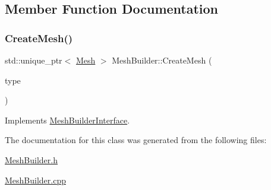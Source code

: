 \subsection{Member Function Documentation}
\mbox{\label{class_mesh_builder_a51d89fe601df06e63112c70416ac03dc}} 
\subsubsection{\texorpdfstring{CreateMesh()}{CreateMesh()}}
{\footnotesize\ttfamily std\+::unique\+\_\+ptr$<$ \mbox{\hyperlink{class_mesh}{Mesh}} $>$ Mesh\+Builder\+::\+Create\+Mesh (\begin{DoxyParamCaption}\item[{\mbox{\hyperlink{_mesh_builder_interface_8h_ad6436347ddb93aed826a19081b53dd61}{M\+E\+S\+H\+T\+Y\+PE}}}]{type }\end{DoxyParamCaption})\hspace{0.3cm}{\ttfamily [virtual]}}



Implements \mbox{\hyperlink{class_mesh_builder_interface_a2d9b31466ef198b2029438970af81323}{Mesh\+Builder\+Interface}}.



The documentation for this class was generated from the following files\+:\begin{DoxyCompactItemize}
\item 
\mbox{\hyperlink{_mesh_builder_8h}{Mesh\+Builder.\+h}}\item 
\mbox{\hyperlink{_mesh_builder_8cpp}{Mesh\+Builder.\+cpp}}\end{DoxyCompactItemize}
